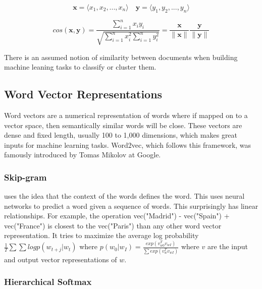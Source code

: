 \documentclass[12pt]{article}
\begin{document}
\begin{equation}
\textbf{x} = \big \langle x_1, x_2, ... , x_n \big \rangle \quad
\textbf{y} = \big \langle y_1, y_2, ... , y_n \big \rangle
\end{equation}

\begin{equation}
cos(\textbf{x}, \textbf{y}) = \frac{\sum_{i=1}^{n} x_i y_i}{\sqrt{\sum_{i=1}^{n} x_i^2 \sum_{i=1}^{n} y_i^2}} = \frac{\textbf{x}}{\|\textbf{x}\|}\frac{\textbf{y}}{\|\textbf{y}\|}
\end{equation}

There is an assumed notion of similarity between documents when building machine leaning tasks to classify or cluster them.

\begin{center}
\subsection{Word Vector Representations}
\end{center}

Word vectors are a numerical representation of words where if mapped on to a vector space, then semantically similar words will be close. These vectors are dense and fixed length, usually 100 to 1,000 dimensions, which makes great inputs for machine learning tasks. Word2vec, which follows this framework, was famously introduced by Tomas Mikolov at Google.
 
 
\subsubsection{Skip-gram}

\cite{NIPS2013_5021} uses the idea that the context of the words defines the word. This uses neural networks to predict a word given a sequence of words. This surprisingly has linear relationships. For example, the operation vec("Madrid") - vec("Spain") + vec("France") is closest to the vec("Paris") than any other word vector representation. It tries to maximize the average log probability $\frac{1}{T}\sum\sum log p(w_{t+j} | w_t)$ where $p(w_0 | w_I) = \frac{exp(v_{w0}^T v_{wI})}{\sum exp(v_{w}^T v_{wI}) }$ where $v$ are the input and output vector representations of $w$.

\subsubsection{Hierarchical Softmax}
\end{document}
